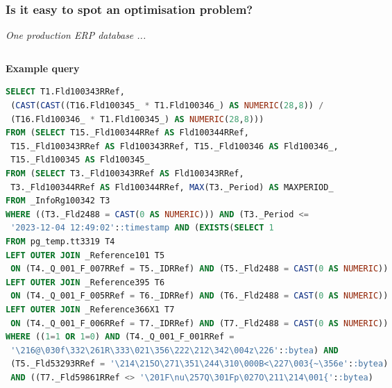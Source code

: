 \documentclass{beamer}
\begin{document}

\begin{frame}[fragile]\frametitle{Is it easy to spot an optimisation problem?}

\vspace{-0.4em}
	{\footnotesize\textit{One production ERP database ...}}

\begin{columns}[T]
\begin{column}{0.55\textwidth}
\begin{center}
	{\scriptsize\textbf{Example query}}\par\vspace{2pt}
\end{center}
\begin{tcolorbox}[enhanced, sharp corners=downhill, arc=1pt,
  colback=paper, colframe=mailrule, boxrule=0.4pt,
  left=3pt, right=3pt, top=3pt, bottom=2pt,
  before skip=0pt, after skip=2pt]
\begin{lstlisting}[language=SQL, breaklines=true, columns=fixed,
  basicstyle=\ttfamily\fontsize{3.1}{3.5}\selectfont,
  keywordstyle=\ttfamily]
SELECT T1.Fld100343RRef,
 (CAST(CAST((T16.Fld100345_ * T1.Fld100346_) AS NUMERIC(28,8)) /
 (T16.Fld100346_ * T1.Fld100345_) AS NUMERIC(28,8)))
FROM (SELECT T15._Fld100344RRef AS Fld100344RRef,
 T15._Fld100343RRef AS Fld100343RRef, T15._Fld100346 AS Fld100346_,
 T15._Fld100345 AS Fld100345_
FROM (SELECT T3._Fld100343RRef AS Fld100343RRef,
 T3._Fld100344RRef AS Fld100344RRef, MAX(T3._Period) AS MAXPERIOD_
FROM _InfoRg100342 T3
WHERE ((T3._Fld2488 = CAST(0 AS NUMERIC))) AND (T3._Period <=
 '2023-12-04 12:49:02'::timestamp AND (EXISTS(SELECT 1
FROM pg_temp.tt3319 T4
LEFT OUTER JOIN _Reference101 T5
 ON (T4._Q_001_F_007RRef = T5._IDRRef) AND (T5._Fld2488 = CAST(0 AS NUMERIC))
LEFT OUTER JOIN _Reference395 T6
 ON (T4._Q_001_F_005RRef = T6._IDRRef) AND (T6._Fld2488 = CAST(0 AS NUMERIC))
LEFT OUTER JOIN _Reference366X1 T7
 ON (T4._Q_001_F_006RRef = T7._IDRRef) AND (T7._Fld2488 = CAST(0 AS NUMERIC))
WHERE ((1=1 OR 1=0) AND (T4._Q_001_F_001RRef =
 '\216@\030f\332\261R\333\021\356\222\212\342\004z\226'::bytea) AND
 (T5._Fld53293RRef = '\214\215O\271\351\244\310\000B<\227\003{~\356e'::bytea)
 AND ((T7._Fld59861RRef <> '\201F\nu\257Q\301Fp\027O\211\214\001{'::bytea)

\end{lstlisting}
\end{tcolorbox}
\end{column}
\end{columns}
\end{frame}
\end{document}
